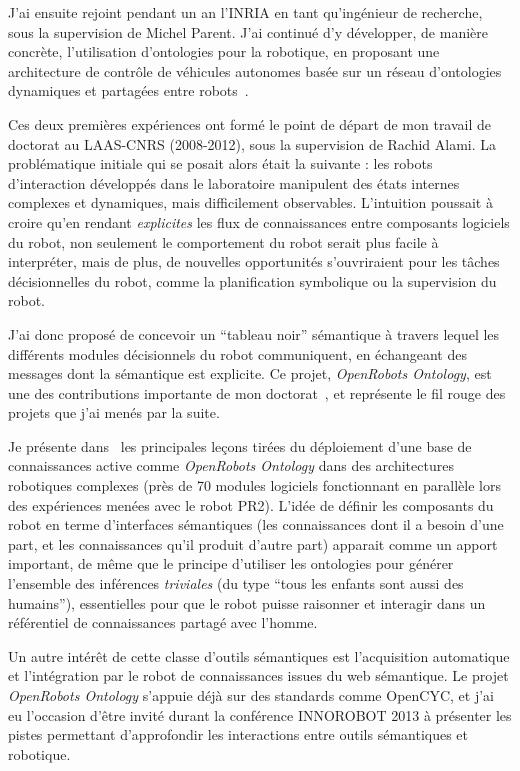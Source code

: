 \documentclass[a4paper]{article}
\begin{document}
J'ai ensuite rejoint pendant un an l'INRIA en tant qu'ingénieur de recherche,
sous la supervision de Michel Parent.  J'ai continué d'y développer, de manière
concrète, l'utilisation d'ontologies pour la robotique, en proposant une
architecture de contrôle de véhicules autonomes basée sur un réseau d'ontologies
dynamiques et partagées entre robots~\cite{mehani2007networking}.

Ces deux premières expériences ont formé le point de départ de mon travail de
doctorat au LAAS-CNRS (2008-2012), sous la supervision de Rachid Alami. La
problématique initiale qui se posait alors était la suivante : les robots
d'interaction développés dans le laboratoire manipulent des états internes
complexes et dynamiques, mais difficilement observables. L'intuition poussait à
croire qu'en rendant \emph{explicites} les flux de connaissances entre
composants logiciels du robot, non seulement le comportement du robot serait
plus facile à interpréter, mais de plus, de nouvelles opportunités s'ouvriraient
pour les tâches décisionnelles du robot, comme la planification symbolique ou la
supervision du robot.

J'ai donc proposé de concevoir un ``tableau noir'' sémantique à travers lequel
les différents modules décisionnels du robot communiquent, en échangeant des
messages dont la sémantique est explicite. Ce projet, \emph{OpenRobots
Ontology}, est une des contributions importante de mon
doctorat~\cite{Lemaignan2010}, et représente le fil rouge des projets
que j'ai menés par la suite.

Je présente dans~\cite{lemaignan2013explicit} les principales leçons tirées du
déploiement d'une base de connaissances active comme \emph{OpenRobots Ontology}
dans des architectures robotiques complexes (près de 70 modules logiciels
fonctionnant en parallèle lors des expériences menées avec le robot PR2). L'idée
de définir les composants du robot en terme d'interfaces sémantiques (les
connaissances dont il a besoin d'une part, et les connaissances qu'il produit
d'autre part) apparait comme un apport important, de même que le principe
d'utiliser les ontologies pour générer l'ensemble des inférences
\emph{triviales} (du type ``tous les enfants sont aussi des humains''),
essentielles pour que le robot puisse raisonner et interagir dans un référentiel
de connaissances partagé avec l'homme.

Un autre intérêt de cette classe d'outils sémantiques est l'acquisition
automatique et l'intégration par le robot de connaissances issues du web
sémantique. Le projet \emph{OpenRobots Ontology} s'appuie déjà sur des
standards comme {\sc OpenCYC}, et j'ai eu l'occasion d'être invité durant la
conférence INNOROBOT 2013 à présenter les pistes permettant d'approfondir les
interactions entre outils sémantiques et robotique.
\end{document}
